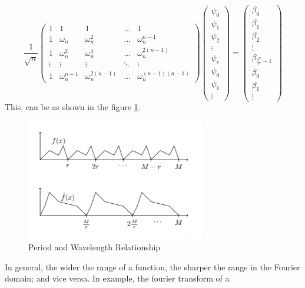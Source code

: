 \documentclass[12pt, oneside]{book}
\theoremstyle{definition}
\theoremstyle{definition}
\theoremstyle{remark}
\begin{document}
\begin{itemize}
    \[ \dfrac{1}{\sqrt{n}}\begin{pmatrix} 1 & 1 & 1 & \ldots & 1 \\ 1 & \omega_n & \omega_n^2 & \ldots & \omega_n^{n-1} \\ 1 & \omega_n^2 & \omega_n^4 & \ldots & \omega_n^{2(n-1)} \\ \vdots & \vdots & \vdots & \ddots & \vdots \\ 1 & \omega_n^{n-1} & \omega_n^{2(n-1)} & \ldots & \omega_n^{(n-1)(n-1)} \end{pmatrix}\begin{pmatrix} \psi_0 \\ \psi_1 \\ \psi_2 \\ \vdots \\ \psi_r \\ \psi_0 \\ \psi_1 \\ \vdots \end{pmatrix}=\begin{pmatrix} \beta_0 \\ \beta_1 \\ \beta_2 \\ \vdots \\ \beta_{\frac{2^n}{r}-1} \\ \beta_0 \\ \beta_1 \\ \vdots \end{pmatrix} \]
    This, can be as shown in the figure \ref{fig:QFT_Period_Wavelength}.
    \begin{figure}[H]
        \centering
        \includegraphics[width=0.7\textwidth]{../images/QFT_period_wavelength.png}
        \caption{Period and Wavelength Relationship}
        \label{fig:QFT_Period_Wavelength}
    \end{figure}
    In general, the wider the range of a function, the sharper the range in the Fourier domain; and vice versa. In example, the fourier transform of a 

\end{itemize}
\end{document}
